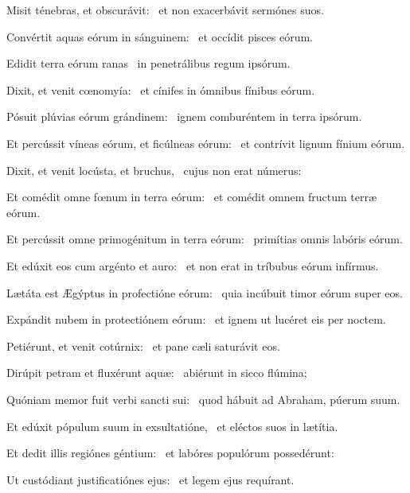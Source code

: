 
\item Misit ténebras, et obscurávit:~\psstar{} et non exacerbávit sermónes suos.

\item Convértit aquas eórum in sánguinem:~\psstar{} et occídit pisces eórum.

\item Edidit terra eórum ranas~\psstar{} in penetrálibus regum ipsórum.

\item Dixit, et venit cœnomyía:~\psstar{} et cínifes in ómnibus fínibus eórum.

\item Pósuit plúvias eórum grándinem:~\psstar{} ignem comburéntem in terra ipsórum.

\item Et percússit víneas eórum, et ficúlneas eórum:~\psstar{} et contrívit lignum fínium eórum.

\item Dixit, et venit locústa, et bruchus,~\psstar{} cujus non erat númerus:

\item Et comédit omne fœnum in terra eórum:~\psstar{} et comédit omnem fructum terræ eórum.

\item Et percússit omne primogénitum in terra eórum:~\psstar{} primítias omnis labóris eórum.

\item Et edúxit eos cum argénto et auro:~\psstar{} et non erat in tríbubus eórum infírmus.

\item Lætáta est Ægýptus in profectióne eórum:~\psstar{} quia incúbuit timor eórum super eos.

\item Expándit nubem in protectiónem eórum:~\psstar{} et ignem ut lucéret eis per noctem.

\item Petiérunt, et venit cotúrnix:~\psstar{} et pane cæli saturávit eos.

\item Dirúpit petram et fluxérunt aquæ:~\psstar{} abiérunt in sicco flúmina;

\item Quóniam memor fuit verbi sancti sui:~\psstar{} quod hábuit ad Abraham, púerum suum.

\item Et edúxit pópulum suum in exsultatióne,~\psstar{} et eléctos suos in lætítia.

\item Et dedit illis regiónes géntium:~\psstar{} et labóres populórum possedérunt:

\item Ut custódiant justificatiónes ejus:~\psstar{} et legem ejus requírant.